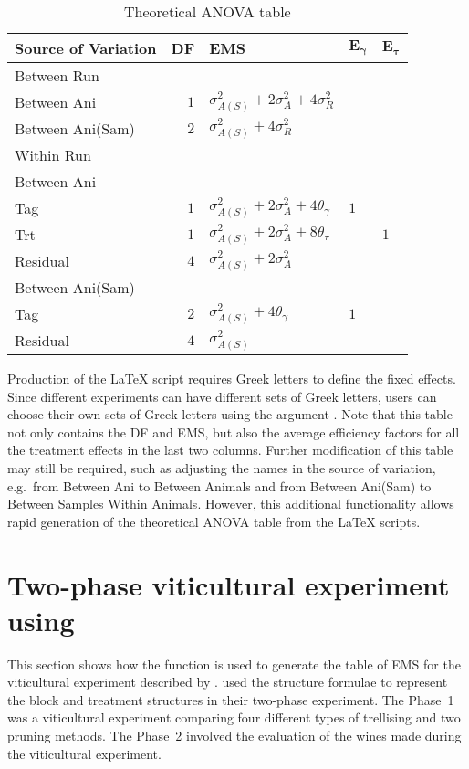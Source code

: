 \documentclass[article]{jss}
\begin{document}
\begin{table}[ht]
\centering
 \caption{Theoretical ANOVA table}
 \begin{tabular}[t]{lrlll} 
 \toprule 
 \multicolumn{1}{l}{\textbf{Source of Variation}} & \multicolumn{1}{l}{\textbf{DF}} & \multicolumn{1}{l}{\textbf{EMS}}& \multicolumn{1}{l}{$\bm{E_{\gamma}}$}&\multicolumn{1}{l}{$\bm{E_{\tau}}$}\\ 
 \midrule 
 Between Run &  &  & & \\ 
 \quad Between Ani & $1$ & $\sigma_{A(S)}^2+2\sigma_{A}^2+4\sigma_{R}^2$ & & \\ \hline 
 \quad Between Ani(Sam) & $2$ & $\sigma_{A(S)}^2+4\sigma_{R}^2$ & & \\ \hline 
 Within Run &  &  & & \\ 
 \quad Between Ani &  &  & & \\ 
 \quad \quad Tag & $1$ & $\sigma_{A(S)}^2+2\sigma_{A}^2+4\theta_{\gamma}$ &$1$ & \\ 
 \quad \quad Trt & $1$ & $\sigma_{A(S)}^2+2\sigma_{A}^2+8\theta_{\tau}$ & & $1$\\ 
 \quad \quad Residual & $4$ & $\sigma_{A(S)}^2+2\sigma_{A}^2$ & & \\ \hline 
 \quad Between Ani(Sam) &  &  & & \\ 
 \quad \quad Tag & $2$ & $\sigma_{A(S)}^2+4\theta_{\gamma}$ &$1$ & \\ 
 \quad \quad Residual & $4$ & $\sigma_{A(S)}^2$ & & \\ 
 \bottomrule 
 \end{tabular} 
  \label{tab:ouputFromR} 
\end{table} 

Production of the {\LaTeX} script requires Greek letters to define the fixed effects. Since different experiments can have different sets of Greek letters, users can choose their own sets of Greek letters using the argument . Note that this table not only contains the DF and EMS, but also the average efficiency factors for all the treatment effects in the last two columns. Further modification of this table may still be required, such as adjusting the names in the source of variation, e.g.\ from Between Ani to Between Animals and from Between Ani(Sam) to Between Samples Within Animals. However, this additional functionality allows rapid generation of the theoretical ANOVA table from the {\LaTeX} scripts.  

\section[Example]{Two-phase viticultural experiment using }\label{sec:example}
This section shows how the function  is used to generate the table of EMS for the viticultural experiment described by \cite{Brien1999}. \citeauthor{Brien1999} used the structure formulae to represent the block and treatment structures in their two-phase experiment. The Phase~1 was a viticultural experiment comparing four different types of trellising and two pruning methods. The Phase~2 involved the evaluation of the wines made during the viticultural experiment.
\end{document}
